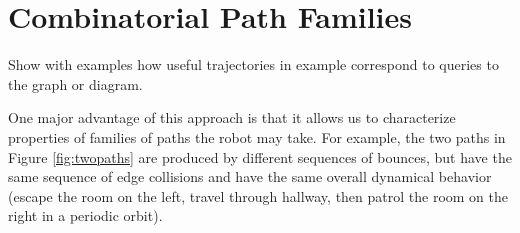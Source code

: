 \documentclass[]{styles/svproc}  %
\begin{document}
%
%

\section{Combinatorial Path Families}

{\color{red}
Show with examples how useful trajectories in example correspond to queries to
the graph or diagram.}

One major advantage of this approach is that it allows us to characterize
properties of families of paths the robot may take. For example, the  
two paths in Figure \ref{fig:twopaths} are produced by different sequences of
bounces, but have the same sequence of edge collisions and have the same overall
dynamical behavior (escape the room on the left, travel through hallway, then
patrol the room on the right in a periodic orbit).
\end{document}
